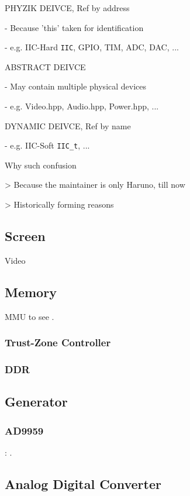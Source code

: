 

PHYZIK DEIVCE, Ref by address

- Because 'this' taken for identification

- e.g. IIC-Hard \verb`IIC`, GPIO, TIM, ADC, DAC, ...

ABSTRACT DEIVCE

- May contain multiple physical devices

- e.g. Video.hpp, Audio.hpp, Power.hpp, ...

DYNAMIC DEIVCE, Ref by name

- e.g. IIC-Soft \verb`IIC_t`, ...

Why such confusion

> Because the maintainer is only Haruno, till now

> Historically forming reasons

\subsection{Screen}
{Video}

\subsection{Memory}

MMU to see .

\subsubsection{Trust-Zone Controller}

\subsubsection{DDR}

\subsection{Generator}

\subsubsection{AD9959}

: .

\subsection{Analog Digital Converter}

